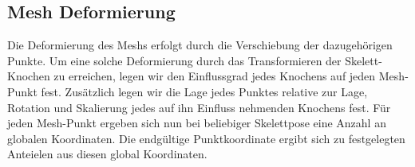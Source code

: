 \subsection{Mesh Deformierung}
Die Deformierung des Meshs erfolgt durch die Verschiebung der dazugehörigen Punkte. Um eine solche Deformierung durch das Transformieren der Skelett-Knochen zu erreichen, legen wir den Einflussgrad jedes Knochens auf jeden Mesh-Punkt fest. Zusätzlich legen wir die Lage jedes Punktes relative zur Lage, Rotation und Skalierung jedes auf ihn Einfluss nehmenden Knochens fest. Für jeden Mesh-Punkt ergeben sich nun bei beliebiger Skelettpose eine Anzahl an globalen Koordinaten. Die endgültige Punktkoordinate ergibt sich zu festgelegten Anteielen aus diesen global Koordinaten.